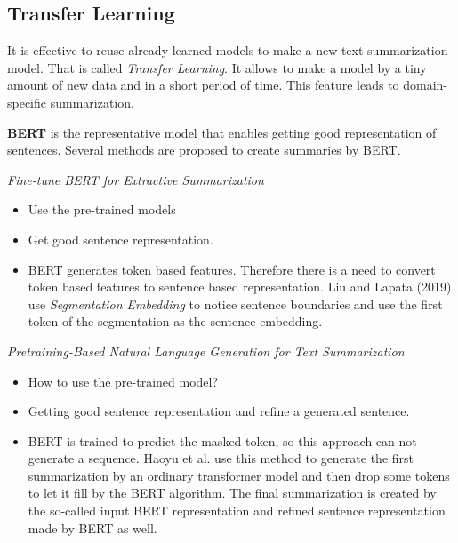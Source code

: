 \subsection{Transfer Learning}

It is effective to reuse already learned models to make a new text summarization model. That is called \textit{Transfer Learning}. It allows to make a model by a tiny amount of new data and in a short period of time. This feature leads to domain-specific summarization.

\textbf{BERT} is the representative model that enables getting good representation of sentences. Several methods are proposed to create summaries by BERT.

\textit{Fine-tune BERT for Extractive Summarization}

\begin{itemize}
	\item Use the pre-trained models
	\item Get good sentence representation.
	\item BERT generates token based features. Therefore there is a need to convert token based features to sentence based representation. Liu and Lapata (2019) \cite{liu-lapata-2019-text} use \textit{Segmentation Embedding} to notice sentence boundaries and use the first token of the segmentation as the sentence embedding.
\end{itemize}

\textit{Pretraining-Based Natural Language Generation for Text Summarization}

\begin{itemize}
	\item How to use the pre-trained model?
	\item Getting good sentence representation and refine a generated sentence.
	\item BERT is trained to predict the masked token, so this approach can not generate a sequence. Haoyu et al. \cite{bert} use this method to generate the first summarization by an ordinary transformer model and then drop some tokens to let it fill by the BERT algorithm. The final summarization is created by the so-called input BERT representation and refined sentence representation made by BERT as well.
\end{itemize}
